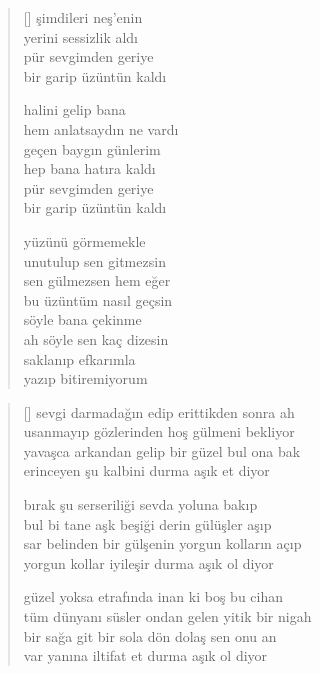 \documentclass[10pt, openright, twoside]{memoir}
\theoremstyle{definition}
\begin{document}
\vspace*{\fill}
%
\newpage
{}
\vspace*{\fill}
\settowidth{\versewidth}{hem anlatsaydın ne vardı}
\begin{verse}[\versewidth]
  şimdileri neş'enin \\
  yerini sessizlik aldı \\
  pür sevgimden geriye \\
  bir garip üzüntün kaldı

  halini gelip bana \\
  hem anlatsaydın ne vardı \\
  geçen baygın günlerim \\
  hep bana hatıra kaldı \\
  pür sevgimden geriye \\
  bir garip üzüntün kaldı

  yüzünü görmemekle \\
  unutulup sen gitmezsin \\
  sen gülmezsen hem eğer \\
  bu üzüntüm nasıl geçsin \\
  söyle bana çekinme \\
  ah söyle sen kaç dizesin \\
  saklanıp efkarımla \\
  yazıp bitiremiyorum
\end{verse}
\vspace*{\fill}
%
\newpage
{}
\vspace*{\fill}
\settowidth{\versewidth}{sar belinden bir gülşenin yorgun kolların açıp}
\begin{verse}[\versewidth]
  sevgi darmadağın edip erittikden sonra ah \\
  usanmayıp gözlerinden hoş gülmeni bekliyor \\
  yavaşca arkandan gelip bir güzel bul ona bak \\
  erinceyen şu kalbini durma aşık et diyor

  bırak şu serseriliği sevda yoluna bakıp \\
  bul bi tane aşk beşiği derin gülüşler aşıp \\
  sar belinden bir gülşenin yorgun kolların açıp \\
  yorgun kollar iyileşir durma aşık ol diyor

  güzel yoksa etrafında inan ki boş bu cihan \\
  tüm dünyanı süsler ondan gelen yitik bir nigah \\
  bir sağa git bir sola dön dolaş sen onu an \\
  var yanına iltifat et durma aşık ol diyor
\end{verse}
\end{document}
